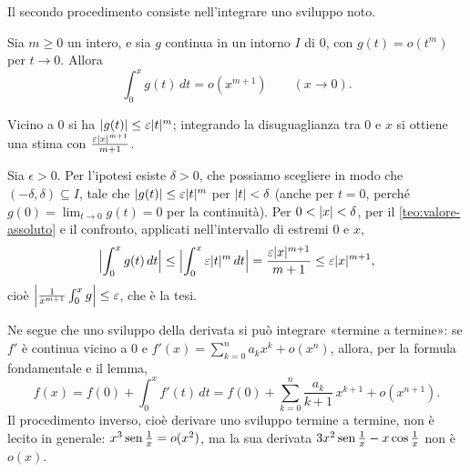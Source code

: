 Il secondo procedimento consiste nell'integrare uno sviluppo noto.

\begin{lemma}\label{lem:integrazione-o}
Sia $m\ge0$ un intero, e sia $g$ continua in un intorno $I$ di $0$, con $g(t)=o(t^{m})$ per
$t\to0$. Allora
\begin{equation}\label{eq:integrazione-o}
  \int_{0}^{x}g(t)\,dt=o(x^{m+1}) \qquad (x\to0) .
\end{equation}
\end{lemma}

\begin{schema}
\end{schema}

\begin{strategia}
Vicino a $0$ si ha $\abs{g(t)}\le\epsilon\abs t^{m}$; integrando la disuguaglianza tra $0$ e $x$ si
ottiene una stima con $\frac{\epsilon\abs x^{m+1}}{m+1}$.
\end{strategia}

\begin{dimostrazione}
Sia $\epsilon>0$. Per l'ipotesi esiste $\delta>0$, che possiamo scegliere in modo che
$(-\delta,\delta)\subseteq I$, tale che $\abs{g(t)}\le\epsilon\abs t^{m}$ per $\abs t<\delta$
(anche per $t=0$, perché $g(0)=\lim_{t\to0}g(t)=0$ per la continuità). Per $0<\abs x<\delta$, per il
\cref{teo:valore-assoluto} e il confronto, applicati nell'intervallo di estremi $0$ e $x$,
\[
  \Bigl|\int_{0}^{x}g(t)\,dt\Bigr|\le\Bigl|\int_{0}^{x}\epsilon\abs t^{m}\,dt\Bigr|=\frac{\epsilon\abs x^{m+1}}{m+1}\le\epsilon\abs x^{m+1} ,
\]
cioè $\Bigl|\frac1{x^{m+1}}\int_{0}^{x}g\Bigr|\le\epsilon$, che è la tesi.
\end{dimostrazione}

Ne segue che uno sviluppo della derivata si può integrare «termine a termine»: se $f'$ è
continua vicino a $0$ e $f'(x)=\sum_{k=0}^{n}a_{k}x^{k}+o(x^{n})$, allora, per la formula
fondamentale e il lemma,
\begin{equation}\label{eq:integrazione-termine}
  f(x)=f(0)+\int_{0}^{x}f'(t)\,dt=f(0)+\sum_{k=0}^{n}\frac{a_{k}}{k+1}\,x^{k+1}+o(x^{n+1}) .
\end{equation}
Il procedimento inverso, cioè derivare uno sviluppo termine a termine, non è lecito in
generale: $x^{3}\sen\frac1x=o(x^{2})$, ma la sua derivata $3x^{2}\sen\frac1x-x\cos\frac1x$ non è $o(x)$.

